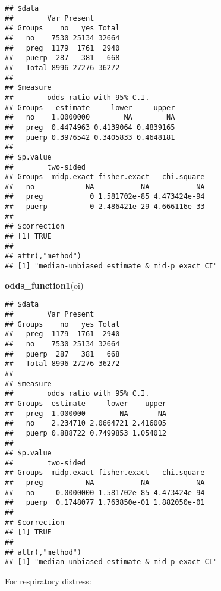 \documentclass[
]{article}
\newenvironment{Shaded}{\begin{snugshade}}{\end{snugshade}}
\newcommand{\DataTypeTok}[1]{\textcolor[rgb]{0.13,0.29,0.53}{#1}}
\newcommand{\KeywordTok}[1]{\textcolor[rgb]{0.13,0.29,0.53}{\textbf{#1}}}
\newcommand{\NormalTok}[1]{#1}
\newcommand{\OperatorTok}[1]{\textcolor[rgb]{0.81,0.36,0.00}{\textbf{#1}}}
\newcommand{\OtherTok}[1]{\textcolor[rgb]{0.56,0.35,0.01}{#1}}
\newcommand{\StringTok}[1]{\textcolor[rgb]{0.31,0.60,0.02}{#1}}
\begin{document}
\begin{verbatim}
## $data
##        Var Present
## Groups    no   yes Total
##   no    7530 25134 32664
##   preg  1179  1761  2940
##   puerp  287   381   668
##   Total 8996 27276 36272
## 
## $measure
##        odds ratio with 95% C.I.
## Groups   estimate     lower     upper
##   no    1.0000000        NA        NA
##   preg  0.4474963 0.4139064 0.4839165
##   puerp 0.3976542 0.3405833 0.4648181
## 
## $p.value
##        two-sided
## Groups  midp.exact fisher.exact   chi.square
##   no            NA           NA           NA
##   preg           0 1.581702e-85 4.473424e-94
##   puerp          0 2.486421e-29 4.666116e-33
## 
## $correction
## [1] TRUE
## 
## attr(,"method")
## [1] "median-unbiased estimate & mid-p exact CI"
\end{verbatim}

\begin{Shaded}
\begin{Highlighting}[]
\KeywordTok{odds_function1}\NormalTok{(oi)}
\end{Highlighting}
\end{Shaded}

\begin{verbatim}
## $data
##        Var Present
## Groups    no   yes Total
##   preg  1179  1761  2940
##   no    7530 25134 32664
##   puerp  287   381   668
##   Total 8996 27276 36272
## 
## $measure
##        odds ratio with 95% C.I.
## Groups  estimate     lower    upper
##   preg  1.000000        NA       NA
##   no    2.234710 2.0664721 2.416005
##   puerp 0.888722 0.7499853 1.054012
## 
## $p.value
##        two-sided
## Groups  midp.exact fisher.exact   chi.square
##   preg          NA           NA           NA
##   no     0.0000000 1.581702e-85 4.473424e-94
##   puerp  0.1748077 1.763850e-01 1.882050e-01
## 
## $correction
## [1] TRUE
## 
## attr(,"method")
## [1] "median-unbiased estimate & mid-p exact CI"
\end{verbatim}

For respiratory distress:

\begin{Shaded}
\end{Shaded}
\end{document}
